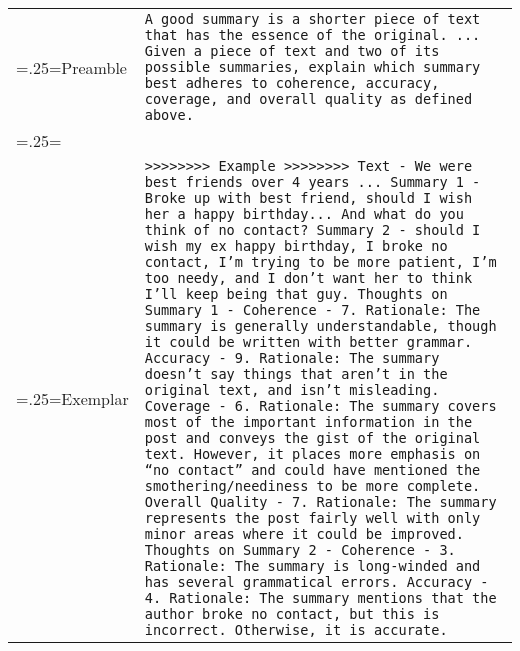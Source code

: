 \documentclass[11pt]{article}
\begin{document}
\begin{table*}[ht]
\small
\centering
    \begin{tabularx}{\linewidth}{>{\hsize=.25\hsize\linewidth=\hsize}X|X}
    Preamble & \texttt{A good summary is a shorter piece of text that has the essence of the original. ... Given a piece of text and two of its possible summaries, explain which summary best adheres to coherence, accuracy, coverage, and overall quality as defined above.} \\
    \\
    Exemplar & \texttt{>>>>>>>> Example >>>>>>>>
    \newline
    \newline
    Text - We were best friends over 4 years ...
    \newline
    Summary 1 - Broke up with best friend, should I wish her a happy birthday... And what do you think of no contact?
    \newline
    Summary 2 - should I wish my ex happy birthday, I broke no contact, I'm trying to be more patient, I'm too needy, and I don't want her to think I'll keep being that guy.
    \newline
    \newline
    Thoughts on Summary 1 -
    \newline
    Coherence - 7. Rationale: The summary is generally understandable, though it could be written with better grammar.
    \newline
    Accuracy - 9. Rationale: The summary doesn't say things that aren't in the original text, and isn't misleading.
    \newline
    Coverage - 6. Rationale: The summary covers most of the important information in the post and conveys the gist of the original text. However, it places more emphasis on ``no contact'' and could have mentioned the smothering/neediness to be more complete.
    \newline
    Overall Quality - 7. Rationale: The summary represents the post fairly well with only minor areas where it could be improved.
    \newline
    \newline
    Thoughts on Summary 2 -
    \newline
    Coherence - 3. Rationale: The summary is long-winded and has several grammatical errors.
    \newline
    Accuracy - 4. Rationale: The summary mentions that the author broke no contact, but this is incorrect. Otherwise, it is accurate.
    \newline
}
\end{tabularx}
\end{table*}
\end{document}
